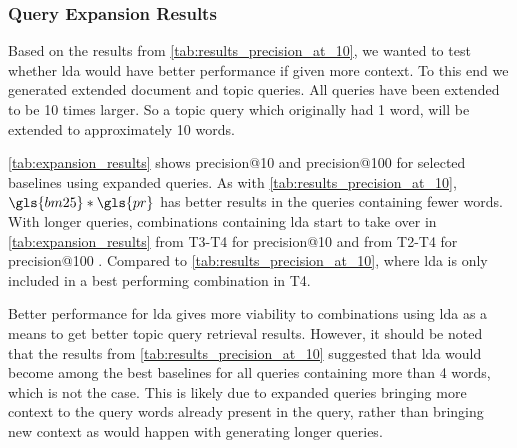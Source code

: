 \subsubsection{Query Expansion Results}

Based on the results from \autoref{tab:results_precision_at_10}, we wanted to test whether \gls{lda} would have better performance if given more context.
To this end we generated extended document and topic queries.
All queries have been extended to be 10 times larger. So a topic query which originally had 1 word, will be extended to approximately 10 words.

\autoref{tab:expansion_results} shows precision@10 and precision@100 for selected baselines using expanded queries.
As with \autoref{tab:results_precision_at_10}, $\gls{bm25} * \gls{pr}$ has better results in the queries containing fewer words.
With longer queries, combinations containing \gls{lda} start to take over in \autoref{tab:expansion_results} from T3-T4 for precision@10 and from T2-T4 for precision@100 .
Compared to \autoref{tab:results_precision_at_10}, where \gls{lda} is only included in a best performing combination in T4.

Better performance for \gls{lda} gives more viability to combinations using \gls{lda} as a means to get better topic query retrieval results.
However, it should be noted that the results from \autoref{tab:results_precision_at_10} suggested that \gls{lda} would become among the best baselines for all queries containing more than 4 words, which is not the case.
This is likely due to expanded queries bringing more context to the query words already present in the query, rather than bringing new context as would happen with generating longer queries.

